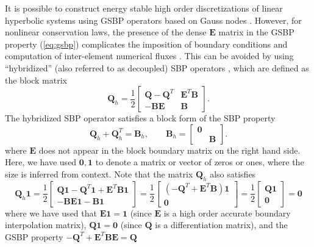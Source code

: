 \documentclass{svjour3}                     %
\newcommand{\LRp}[1]{\left( #1 \right)}
\begin{document}
It is possible to construct energy stable high order discretizations of linear hyperbolic systems using GSBP operators based on Gauss nodes \cite{fernandez2014generalized}.  However, for nonlinear conservation laws, the presence of the dense $\bm{E}$ matrix in the GSBP property (\ref{eq:gsbp}) complicates the imposition of boundary conditions and computation of inter-element numerical fluxes \cite{crean2018entropy, chan2017discretely, chan2018efficient}.  This can be avoided by using ``hybridized'' (also referred to as decoupled) SBP operators \cite{chan2017discretely, chenreview, chan2019skew}, which are defined as the block matrix 
\[
\bm{Q}_h = \frac{1}{2}\begin{bmatrix}
\bm{Q}-\bm{Q}^T & \bm{E}^T\bm{B}\\
-\bm{B}\bm{E} & \bm{B}
\end{bmatrix}.
\]
The hybridized SBP operator satisfies a block form of the SBP property
\begin{equation}
\bm{Q}_h + \bm{Q}_h^T = \bm{B}_h, \qquad \bm{B}_h =  \begin{bmatrix}
\bm{0} & \\
& \bm{B}\end{bmatrix}.
\label{eq:hsbp}
\end{equation}
where $\bm{E}$ does not appear in the block boundary matrix on the right hand side.  Here, we have used $\bm{0}, \bm{1}$ to denote a matrix or vector of zeros or ones, where the size is inferred from context.  Note that the matrix $\bm{Q}_h$ also satisfies
\begin{equation}
\bm{Q}_h\bm{1} = 
\frac{1}{2}\begin{bmatrix}
\bm{Q}\bm{1}-\bm{Q}^T\bm{1} + \bm{E}^T\bm{B}\bm{1}\\
-\bm{B}\bm{E}\bm{1} - \bm{B}\bm{1}
\end{bmatrix}= 
\frac{1}{2}\begin{bmatrix}
\LRp{-\bm{Q}^T + \bm{E}^T\bm{B}}\bm{1}\\
\bm{0}
\end{bmatrix}=
\frac{1}{2}\begin{bmatrix}
\bm{Q}\bm{1}\\
\bm{0}
\end{bmatrix} = \bm{0}
\label{eq:Qh1}
\end{equation}
where we have used that $\bm{E}\bm{1} = \bm{1}$ (since $\bm{E}$ is a high order accurate boundary interpolation matrix), $\bm{Q}\bm{1} = \bm{0}$ (since $\bm{Q}$ is a differentiation matrix), and the GSBP property $-\bm{Q}^T + \bm{E}^T\bm{B}\bm{E} = \bm{Q}$
\end{document}
